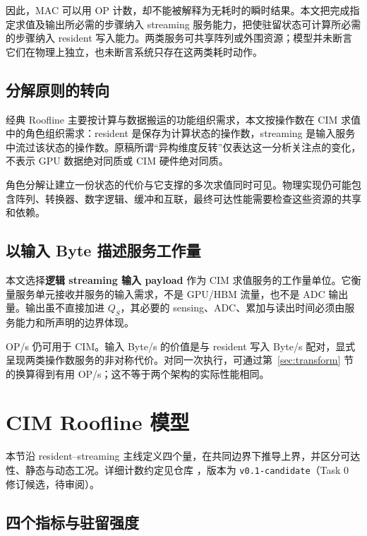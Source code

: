 \documentclass[11pt, a4paper]{ctexart}
\theoremstyle{definition}
\begin{document}
因此，MAC 可以用 OP 计数，却不能被解释为无耗时的瞬时结果。本文把完成指定求值及输出所必需的步骤纳入 streaming 服务能力，把使驻留状态可计算所必需的步骤纳入 resident 写入能力。两类服务可共享阵列或外围资源；模型并未断言它们在物理上独立，也未断言系统只存在这两类耗时动作。

\subsection{分解原则的转向}
\label{sec:inversion}

经典 Roofline 主要按计算与数据搬运的功能组织需求，本文按操作数在 CIM 求值中的角色组织需求：resident 是保存为计算状态的操作数，streaming 是输入服务中流过该状态的操作数。原稿所谓“异构维度反转”仅表达这一分析关注点的变化，不表示 GPU 数据绝对同质或 CIM 硬件绝对同质。

角色分解让建立一份状态的代价与它支撑的多次求值同时可见。物理实现仍可能包含阵列、转换器、数字逻辑、缓冲和互联，最终可达性能需要检查这些资源的共享和依赖。

\subsection{以输入 Byte 描述服务工作量}
\label{sec:work_unit}

本文选择\textbf{逻辑 streaming 输入 payload} 作为 CIM 求值服务的工作量单位。它衡量服务单元接收并服务的输入需求，不是 GPU/HBM 流量，也不是 ADC 输出量。输出虽不直接加进 $Q_S$，其必要的 sensing、ADC、累加与读出时间必须由服务能力和所声明的边界体现。

OP/s 仍可用于 CIM。输入 Byte/s 的价值是与 resident 写入 Byte/s 配对，显式呈现两类操作数服务的非对称代价。对同一次执行，可通过第~\ref{sec:transform} 节的换算得到有用 OP/s；这不等于两个架构的实际性能相同。
\newpage

\section{CIM Roofline 模型}
\label{sec:cim_roofline}

本节沿 resident--streaming 主线定义四个量，在共同边界下推导上界，并区分可达性、静态与动态工况。详细计数约定见仓库 ，版本为 \texttt{v0.1-candidate}（Task 0 修订候选，待审阅）。

\subsection{四个指标与驻留强度}
\label{sec:cim_indicators}
\end{document}
